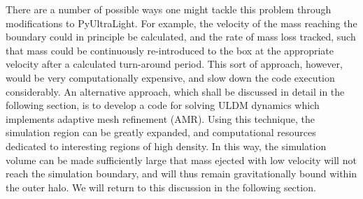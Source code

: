 There are a number of possible ways one might tackle this problem through modifications to PyUltraLight. For example, the velocity of the mass reaching the boundary could in principle be calculated, and the rate of mass loss tracked, such that mass could be continuously re-introduced to the box at the appropriate velocity after a calculated turn-around period. This sort of approach, however, would be very computationally expensive, and slow down the code execution considerably. An alternative approach, which shall be discussed in detail in the following section, is to develop a code for solving ULDM dynamics which implements adaptive mesh refinement (AMR). Using this technique, the simulation region can be greatly expanded, and computational resources dedicated to interesting regions of high density. In this way, the simulation volume can be made sufficiently large that mass ejected with low velocity will not reach the simulation boundary, and will thus remain gravitationally bound within the outer halo. We will return to this discussion in the following section. 

